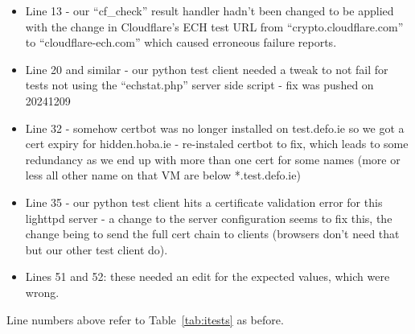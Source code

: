 \begin{itemize}
    \item Line 13 - our ``cf\_check'' result handler hadn't been changed to be
        applied with the change in Cloudflare's ECH test URL from
        ``crypto.cloudflare.com'' to ``cloudflare-ech.com'' which caused
        erroneous failure reports.

    \item Line 20 and similar - our python test client needed a tweak to not
        fail for tests not using the ``echstat.php'' server side script - fix
        was pushed on 20241209

    \item Line 32 - somehow certbot was no longer installed on test.defo.ie so
        we got a cert expiry for hidden.hoba.ie - re-instaled certbot to fix,
        which leads to some redundancy as we end up with more than one cert for
        some names (more or less all other name on that VM are below
        *.test.defo.ie)

    \item Line 35 - our python test client hits a certificate validation error
        for this lighttpd server - a change to the server configuration seems
        to fix this, the change being to send the full cert chain to clients
        (browsers don't need that but our other test client do).

    \item Lines 51 and 52: these needed an edit for the expected values, which were
        wrong.

\end{itemize}

Line numbers above refer to Table~\ref{tab:itests} as before.

